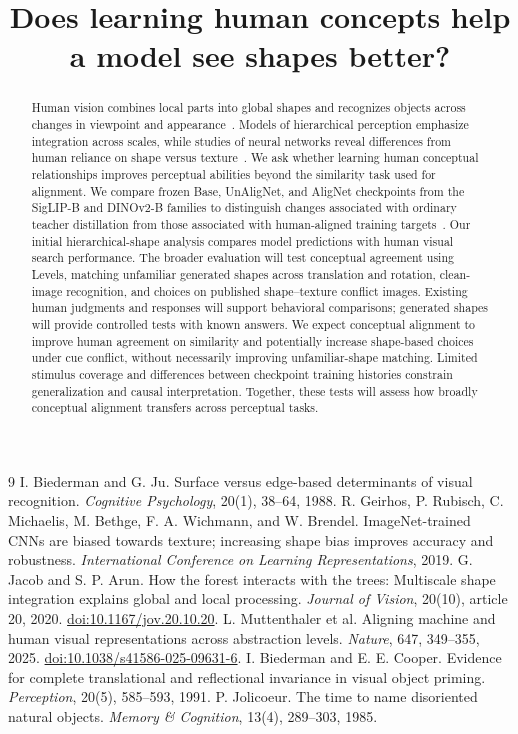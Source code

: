 \documentclass[11pt]{article}
\title{Does learning human concepts help a model see shapes better?}
\author{}
\date{}
\begin{document}
\maketitle
\begin{abstract}
Human vision combines local parts into global shapes and recognizes objects across changes in viewpoint and appearance~\cite{biederman,jacob,cooper,jolicoeur}. Models of hierarchical perception emphasize integration across scales, while studies of neural networks reveal differences from human reliance on shape versus texture~\cite{jacob,geirhos}. We ask whether learning human conceptual relationships improves perceptual abilities beyond the similarity task used for alignment. We compare frozen Base, UnAligNet, and AligNet checkpoints from the SigLIP-B and DINOv2-B families to distinguish changes associated with ordinary teacher distillation from those associated with human-aligned training targets~\cite{alignet}. Our initial hierarchical-shape analysis compares model predictions with human visual search performance. The broader evaluation will test conceptual agreement using Levels, matching unfamiliar generated shapes across translation and rotation, clean-image recognition, and choices on published shape--texture conflict images. Existing human judgments and responses will support behavioral comparisons; generated shapes will provide controlled tests with known answers. We expect conceptual alignment to improve human agreement on similarity and potentially increase shape-based choices under cue conflict, without necessarily improving unfamiliar-shape matching. Limited stimulus coverage and differences between checkpoint training histories constrain generalization and causal interpretation. Together, these tests will assess how broadly conceptual alignment transfers across perceptual tasks.
\end{abstract}
\begin{thebibliography}{9}
 I. Biederman and G. Ju. Surface versus edge-based determinants of visual recognition. \emph{Cognitive Psychology}, 20(1), 38--64, 1988.
 R. Geirhos, P. Rubisch, C. Michaelis, M. Bethge, F. A. Wichmann, and W. Brendel. ImageNet-trained CNNs are biased towards texture; increasing shape bias improves accuracy and robustness. \emph{International Conference on Learning Representations}, 2019.
 G. Jacob and S. P. Arun. How the forest interacts with the trees: Multiscale shape integration explains global and local processing. \emph{Journal of Vision}, 20(10), article 20, 2020. \href{https://doi.org/10.1167/jov.20.10.20}{doi:10.1167/jov.20.10.20}.
 L. Muttenthaler et al. Aligning machine and human visual representations across abstraction levels. \emph{Nature}, 647, 349--355, 2025. \href{https://doi.org/10.1038/s41586-025-09631-6}{doi:10.1038/s41586-025-09631-6}.
 I. Biederman and E. E. Cooper. Evidence for complete translational and reflectional invariance in visual object priming. \emph{Perception}, 20(5), 585--593, 1991.
 P. Jolicoeur. The time to name disoriented natural objects. \emph{Memory \& Cognition}, 13(4), 289--303, 1985.
\end{thebibliography}
\end{document}
